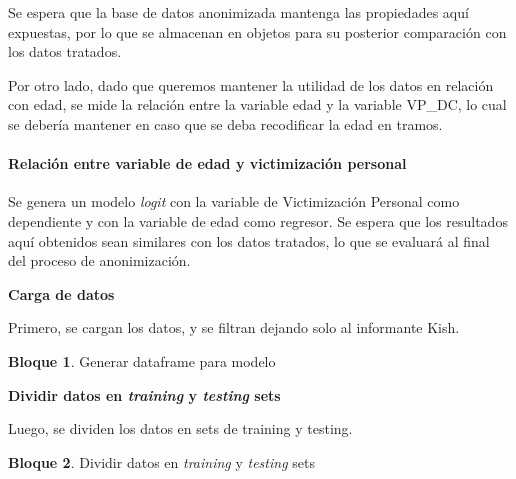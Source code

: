 \documentclass[
]{book}
\newenvironment{Shaded}{\begin{snugshade}}{\end{snugshade}}
\newcommand{\DecValTok}[1]{\textcolor[rgb]{0.00,0.00,0.81}{#1}}
\newcommand{\NormalTok}[1]{#1}
\newcommand{\OtherTok}[1]{\textcolor[rgb]{0.56,0.35,0.01}{#1}}
\newcommand{\SpecialCharTok}[1]{\textcolor[rgb]{0.00,0.00,0.00}{#1}}
\theoremstyle{definition}
\theoremstyle{definition}
\newtheorem{example}{Bloque}[chapter]
\theoremstyle{definition}
\theoremstyle{definition}
\theoremstyle{remark}
\begin{document}
Se espera que la base de datos anonimizada mantenga las propiedades aquí expuestas, por lo que se almacenan en objetos para su posterior comparación con los datos tratados.

Por otro lado, dado que queremos mantener la utilidad de los datos en relación con edad, se mide la relación entre la variable edad y la variable VP\_DC, lo cual se debería mantener en caso que se deba recodificar la edad en tramos.

\hypertarget{relaciuxf3n-entre-variable-de-edad-y-victimizaciuxf3n-personal}{%
\paragraph{Relación entre variable de edad y victimización personal}\label{relaciuxf3n-entre-variable-de-edad-y-victimizaciuxf3n-personal}}

Se genera un modelo \emph{logit} con la variable de Victimización Personal como dependiente y con la variable de edad como regresor. Se espera que los resultados aquí obtenidos sean similares con los datos tratados, lo que se evaluará al final del proceso de anonimización.

\textbf{Carga de datos}

Primero, se cargan los datos, y se filtran dejando solo al informante Kish.

\begin{example}
\protect\hypertarget{exm:bloque14nbm}{}\label{exm:bloque14nbm}Generar dataframe para modelo
\end{example}

\begin{Shaded}
\end{Shaded}

\textbf{Dividir datos en \emph{training} y \emph{testing} sets}

Luego, se dividen los datos en sets de training y testing.

\begin{example}
\protect\hypertarget{exm:bloque15nbm}{}\label{exm:bloque15nbm}Dividir datos en \emph{training} y \emph{testing} sets
\end{example}
\end{document}
